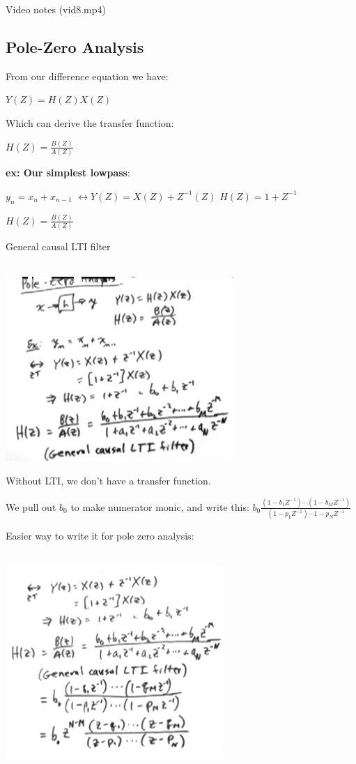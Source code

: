 Video notes (vid8.mp4)
\subsection*{Pole-Zero Analysis}

From our difference equation we have:

$Y(Z) = H(Z)X(Z)$

Which can derive the transfer function:

$H(Z) = \frac{B(Z)}{A(Z)}$

\textbf{ex: Our simplest lowpass}:

$y_n= x_n + x_{n - 1}$
$\leftrightarrow Y(Z) = X(Z) + Z^{-1}(Z)$
$H(Z) = 1 + Z^{-1}$


$H(Z) = \frac{B(Z)}{A(Z)}$

General causal LTI filter

\\
\includegraphics[scale=0.8]{frames/12a}

Without LTI, we don't have a transfer function. 

We pull out $b_0$ to make numerator monic, and write this:
$b_0 \frac{(1 - b_1 Z^{-1})\cdots(1 - b_M Z^{-1})}
{(1 - p_1Z^{-1})\cdots{1 - p_N Z^{-1}}}$


Easier way to write it for pole zero analysis:

\\
\includegraphics[scale=0.8]{frames/12b}

